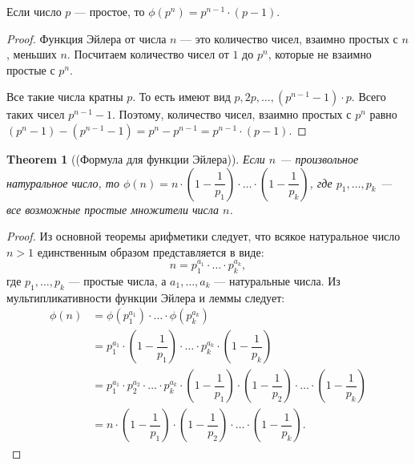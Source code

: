 \documentclass[a4paper]{article}
\theoremstyle{named}
\newtheorem*{namedtheorem}{Theorem}
\begin{document}
\begin{colloq}
        \begin{lemma*}
            Если число $p$ --- простое, то $\phi(p^n) = p^{n - 1} \cdot (p - 1)$.
        \end{lemma*}

        \begin{proof}
            Функция Эйлера от числа $n$ --- это количество чисел, взаимно простых с $n$, меньших $n$. Посчитаем количество чисел от $1$ до $p^n$, которые не взаимно простые с $p^n$.

            Все такие числа кратны $p$. То есть имеют вид $p, 2p, \dots, (p^{n - 1} - 1) \cdot p$. Всего таких чисел $p^{n - 1} - 1$. Поэтому, количество чисел, взаимно простых с $p^n$ равно $(p^n - 1) - (p^{n - 1} - 1) = p^n - p^{n - 1} = p^{n - 1} \cdot (p - 1)$.
        \end{proof}

        \begin{namedtheorem}[(Формула для функции Эйлера)]
            Если $n$ --- произвольное натуральное число, то $\phi(n) = n \cdot \left(1 - \dfrac{1}{p_1}\right) \cdot \dots \cdot \left(1 - \dfrac{1}{p_k}\right)$, где $p_1, \dots, p_k$ --- все возможные простые множители числа $n$.
        \end{namedtheorem}

        \begin{proof}
            Из основной теоремы арифметики следует, что всякое натуральное число $n > 1$ единственным образом представляется в виде:
            \begin{equation*}
                n = p_1^{a_1} \cdot \dots \cdot p_k^{a_k},
            \end{equation*}
            где $p_1, \dots, p_k$ --- простые числа, а $a_1, \dots, a_k$ --- натуральные числа. Из мультипликативности функции Эйлера и леммы следует:
            \begin{align*}
                \phi(n) 
                &= \phi(p_1^{a_1}) \cdot \dots \cdot \phi(p_k^{a_k}) \\
                &= p_1^{a_1} \cdot \left(1 - \dfrac{1}{p_1}\right) \cdot \dots \cdot p_k^{a_k} \cdot \left(1 - \dfrac{1}{p_k}\right) \\
                &= p_1^{a_1} \cdot p_2^{a_2} \cdot \dots \cdot p_k^{a_k} \cdot \left(1 - \dfrac{1}{p_1}\right) \cdot \left(1 - \dfrac{1}{p_2}\right) \cdot \dots \cdot \left(1 - \dfrac{1}{p_k}\right) \\
                &= n \cdot \left(1 - \dfrac{1}{p_1}\right) \cdot \left(1 - \dfrac{1}{p_2}\right) \cdot \dots \cdot \left(1 - \dfrac{1}{p_k}\right).
            \end{align*}
        \end{proof}


\end{colloq}
\end{document}
